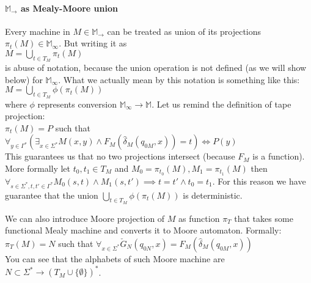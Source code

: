 \documentclass[12pt]{article}
\begin{document}
 \paragraph{$\mathbb{M}_\rightarrow$ as Mealy-Moore union}
 Every machine in $M\in\mathbb{M}_\rightarrow$ can be treated as union  of its projections $\pi_t(M) \in \mathbb{M}_\infty$. But writing it as \\
 $M = \bigcup_{t\in T_M} \pi_t(M)$ \\
 is abuse of notation, because the union operation is not defined (as we will show below) for $\mathbb{M}_\infty$. What we actually mean by this notation is something like this: \\
 $M = \bigcup_{t\in T_M} \phi(\pi_t(M))$ \\
 where $\phi$ represents conversion $\mathbb{M}_\infty \rightarrow \mathbb{M}$. Let us remind the definition of tape projection: \\
 $\pi_t(M) = P$ such that $\forall_{y\in\Gamma^*} (\exists_{x\in\Sigma^*} M(x,y) \wedge F_M(\hat{\delta}_M(q_{0M},x))=t) \iff P(y)$ \\
 This guarantees us that no two projections intersect (because $F_M$ is a function). More formally let $t_0, t_1 \in T_M$ and $M_0 = \pi_{t_0}(M), M_1=\pi_{t_1}(M)$ then $\forall_{s\in\Sigma^*,t,t'\in\Gamma^*} M_0(s,t) \wedge M_1(s,t') \implies t=t' \wedge t_0 = t_1$. For this reason we have guarantee that the union $ \bigcup_{t\in T_M} \phi(\pi_t(M))$ is deterministic.
 
 We can also introduce Moore projection of $M$ as function $\pi_T $ that takes some functional Mealy machine and converts it to Moore automaton. Formally: \\
 $\pi_T(M) = N$ such that $\forall_{x\in\Sigma^*} \check{G}_N(q_{0N},x) = F_M(\hat{\delta}_M(q_{0M},x))$ \\
 You can see that the alphabets of such Moore machine are $N \subset \Sigma^* \rightarrow (T_M \cup \{\emptyset\})^*$.
 
\end{document}
